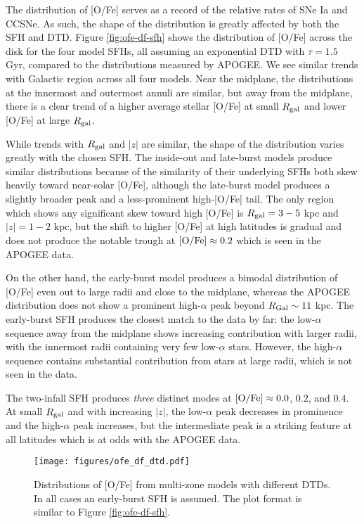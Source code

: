 \documentclass[twocolumn,twocolappendix,linenumbers,trackchanges]{aastex631}
\begin{document}
The distribution of [O/Fe] serves as a record of the relative rates of SNe Ia and CCSNe. As such, the shape of the distribution is greatly affected by both the SFH and DTD. Figure \ref{fig:ofe-df-sfh} shows the distribution of [O/Fe] across the disk for the four model SFHs, all assuming an exponential DTD with $\tau=1.5$ Gyr, compared to the distributions measured by APOGEE. We see similar trends with Galactic region across all four models. Near the midplane, the distributions at the innermost and outermost annuli are similar, but away from the midplane, there is a clear trend of a higher average stellar [O/Fe] at small $R_{\rm gal}$ and lower [O/Fe] at large $R_{\rm gal}$.

While trends with $R_{\rm gal}$ and $|z|$ are similar, the shape of the distribution varies greatly with the chosen SFH. The inside-out and late-burst models produce similar distributions because of the similarity of their underlying SFHs \textemdash both skew heavily toward near-solar [O/Fe], although the late-burst model produces a slightly broader peak and a less-prominent high-[O/Fe] tail. The only region which shows any significant skew toward high [O/Fe] is $R_{\rm gal}=3-5$ kpc and $|z|=1-2$ kpc, but the shift to higher [O/Fe] at high latitudes is gradual and does not produce the notable trough at ${\rm [O/Fe]}\approx0.2$ which is seen in the APOGEE data. 

On the other hand, the early-burst model produces a bimodal distribution of [O/Fe] even out to large radii and close to the midplane, whereas the APOGEE distribution does not show a prominent high-$\alpha$ peak beyond $R_{\rm{Gal}}\sim11$ kpc. 
The early-burst SFH produces the closest match to the data by far: the low-$\alpha$ sequence away from the midplane shows increasing contribution with larger radii, with the innermost radii containing very few low-$\alpha$ stars. However, the high-$\alpha$ sequence contains substantial contribution from stars at large radii, which is not seen in the data.

The two-infall SFH produces \textit{three} distinct modes at ${\rm [O/Fe]}\approx 0.0$, $0.2$, and $0.4$. At small $R_{\rm gal}$ and with increasing $|z|$, the low-$\alpha$ peak decreases in prominence and the high-$\alpha$ peak increases, but the intermediate peak is a striking feature at all latitudes which is at odds with the APOGEE data.

\begin{figure*}
    \centering
    \texttt{[image: figures/ofe\_df\_dtd.pdf]}
    \caption{Distributions of [O/Fe] from multi-zone models with different DTDs. In all cases an early-burst SFH is assumed. The plot format is similar to Figure \ref{fig:ofe-df-sfh}.}
    \label{fig:ofe-df-dtd}
\end{figure*}
\end{document}
